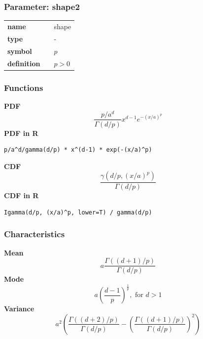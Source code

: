 \subsubsection*{Parameter: shape2}

\noindent\begin{tabular}{p{2cm}cl}
\textbf{name} & & shape \\
\textbf{type} & & - \\
\textbf{symbol} & & $p$  \\
\textbf{definition} & & $p > 0$
\end{tabular}
\subsubsection*{Functions}

\smallskip \noindent \hspace{.2cm} \textbf{PDF} 
\begin{equation*}\frac{p/a^d}{\Gamma(d/p)} x^{d-1}e^{-(x/a)^p}\end{equation*}
\smallskip \noindent \hspace{.2cm} \textbf{PDF in R}  
\begin{verbatim}p/a^d/gamma(d/p) * x^(d-1) * exp(-(x/a)^p)\end{verbatim}
\smallskip \noindent \hspace{.2cm} \textbf{CDF} 
\begin{equation*}\frac{\gamma(d/p, (x/a)^p)}{\Gamma(d/p)}\end{equation*}
\smallskip \noindent \hspace{.2cm} \textbf{CDF in R} 
\begin{verbatim}Igamma(d/p, (x/a)^p, lower=T) / gamma(d/p)\end{verbatim}
\smallskip
\subsubsection*{Characteristics}
\smallskip \noindent \hspace{.2cm} \textbf{Mean} 
\begin{equation*}a \frac{\Gamma((d+1)/p)}{\Gamma(d/p)}\end{equation*}
\smallskip \noindent \hspace{.2cm} \textbf{Mode} 
\begin{equation*}a \left(\frac{d-1}{p}\right)^{\frac{1}{p}}, \text{ for } d>1\end{equation*}
\smallskip \noindent \hspace{.2cm} \textbf{Variance} 
\begin{equation*}a^2\left(\frac{\Gamma((d+2)/p)}{\Gamma(d/p)} - \left(\frac{\Gamma((d+1)/p)}{\Gamma(d/p)}\right)^2\right)\end{equation*}
\smallskip
